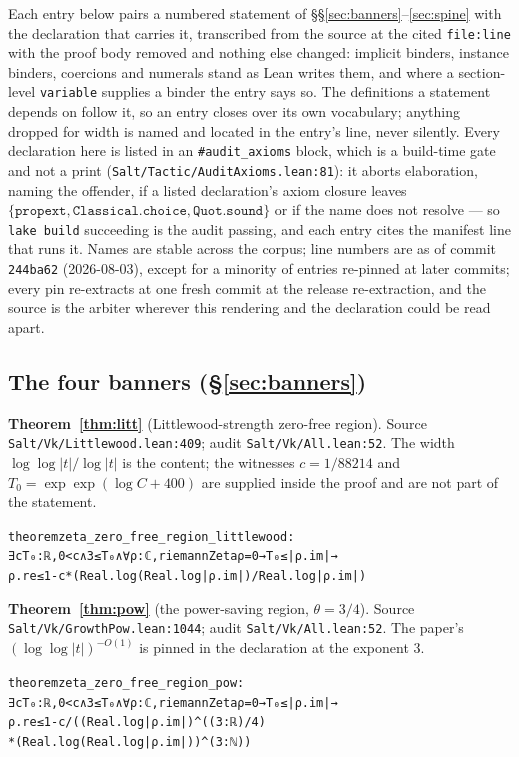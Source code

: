 \documentclass{CUP-JNL-FMP}
\newcommand{\leaninline}[1]{{\small\texttt{#1}}}
\theoremstyle{remark}
\begin{document}
Each entry below pairs a numbered statement of \S\S\ref{sec:banners}--\ref{sec:spine}
with the declaration that carries it, transcribed from the source at the cited
\leaninline{file:line} with the proof body removed and nothing else changed:
implicit binders, instance binders, coercions and numerals stand as Lean writes
them, and where a section-level \leaninline{variable} supplies a binder the entry
says so. The definitions a statement depends on follow it, so an entry closes
over its own vocabulary; anything dropped for width is named and located in the
entry's line, never silently. Every declaration here is listed in an
\leaninline{\#audit\_axioms} block, which is a build-time gate and not a print
(\leaninline{Salt/Tactic/AuditAxioms.lean:81}): it aborts elaboration, naming the
offender, if a listed declaration's axiom closure leaves
$\{\texttt{propext}, \texttt{Classical.choice}, \texttt{Quot.sound}\}$ or if the
name does not resolve --- so \leaninline{lake build} succeeding is the audit
passing, and each entry cites the manifest line that runs it. Names are stable
across the corpus; line numbers are as of commit \leaninline{244ba62}
(2026-08-03), except for a minority of entries re-pinned at later commits;
every pin re-extracts at one fresh commit at the release re-extraction, and
the source is the arbiter wherever this rendering and the declaration could
be read apart.

\subsection{The four banners (\S\ref{sec:banners})}

\medskip\noindent\textbf{Theorem~\ref{thm:litt}} (Littlewood-strength zero-free
region). Source \leaninline{Salt/Vk/Littlewood.lean:409}; audit
\leaninline{Salt/Vk/All.lean:52}. The width $\log\log|t|/\log|t|$ is the content;
the witnesses $c = 1/88214$ and $T_0 = \exp\exp(\log C + 400)$ are supplied inside
the proof and are not part of the statement.
{\footnotesize\begin{alltt}
theorem zeta_zero_free_region_littlewood :
    ∃ c T₀ : ℝ, 0 < c ∧ 3 ≤ T₀ ∧ ∀ ρ : ℂ, riemannZeta ρ = 0 → T₀ ≤ |ρ.im| →
      ρ.re ≤ 1 - c * (Real.log (Real.log |ρ.im|) / Real.log |ρ.im|)
\end{alltt}}

\medskip\noindent\textbf{Theorem~\ref{thm:pow}} (the power-saving region,
$\theta = 3/4$). Source \leaninline{Salt/Vk/GrowthPow.lean:1044}; audit
\leaninline{Salt/Vk/All.lean:52}. The paper's $(\log\log|t|)^{-O(1)}$ is pinned in
the declaration at the exponent $3$.
{\footnotesize\begin{alltt}
theorem zeta_zero_free_region_pow :
    ∃ c T₀ : ℝ, 0 < c ∧ 3 ≤ T₀ ∧ ∀ ρ : ℂ, riemannZeta ρ = 0 → T₀ ≤ |ρ.im| →
      ρ.re ≤ 1 - c / ((Real.log |ρ.im|) ^ ((3 : ℝ) / 4)
        * (Real.log (Real.log |ρ.im|)) ^ (3 : ℕ))
\end{alltt}}
\end{document}
